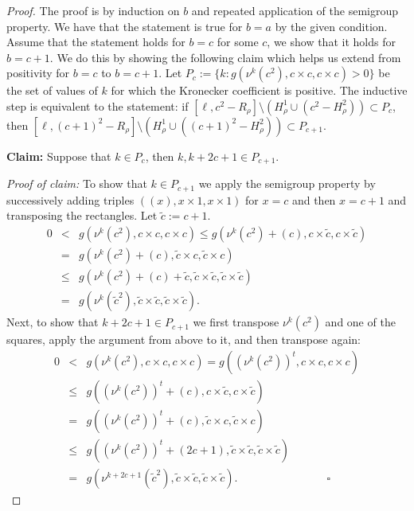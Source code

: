 \documentclass{article}
\numberwithin{equation}{section}
\theoremstyle{definition}
\begin{document}
\begin{proof}
The proof is by induction on $b$ and repeated application of the semigroup property.  We have that the statement is true for $b=a$ by the given condition. Assume that the statement holds for $b=c$ for some $c$, we show that it holds for $b=c+1$. We do this by showing the following claim which helps us extend from positivity for $b=c$ to $b=c+1$. Let $P_c := \{k: g( \nu^k(c^2), c \times c, c \times c) >0 \}$ be the set of values of $k$ for which the Kronecker coefficient is positive. The inductive step is equivalent to the statement: if $[ \ell , c^2 - R_\rho] \setminus \left( H^1_{\rho} \cup (c^2 - H^2_\rho) \right) \subset P_c$, then $[ \ell , (c+1)^2 - R_\rho] \setminus \left( H^1_{\rho} \cup ((c+1)^2 - H^2_\rho) \right) \subset P_{c+1}$.

\textbf{Claim:} Suppose that $k \in P_c$, then $k, k+2c+1 \in P_{c+1}$.

\textit{Proof of claim:} 
To show that $k \in P_{c+1}$
 we apply the semigroup property by successively adding triples $((x), x \times 1, x \times 1)$ for $x=c$ and then $x=c+1$ and transposing the rectangles.
 Let $\tilde c := c+1$.
\begin{eqnarray*}
0 &<&
g( \nu^k(c^2), c\times c, c\times c) \leq  g( \nu^k(c^2) + (c ), c\times \tilde c, c \times \tilde c) \\
&=& g( \nu^k(c^2) + (c) , \tilde c \times c, \tilde c \times c)\\
&\leq& g( \nu^k(c^2) + (c)+\tilde c , \tilde c \times {\tilde c}, {\tilde c} \times {\tilde c} ) \\
 &=& g(\nu^k( {\tilde c}^2), {\tilde c}\times {\tilde c}, {\tilde c}\times {\tilde c} ).
\end{eqnarray*}
Next, to show that $k +2c+1 \in P_{c+1}$ we first transpose $\nu^k(c^2)$ and one of the squares, apply the argument from above to it, and then transpose again:
\begin{eqnarray*} 
0 &<& g( \nu^{k} (c^2), c\times c, c\times c) = g( (\nu^{k} (c^2))^t  , c\times c, c\times c)\\
 &\leq& g( (\nu^k(c^2))^t + (c ), c\times {\tilde c}, c \times {\tilde c}) \\
 &=& g( (\nu^k(c^2))^t + (c) , {\tilde c} \times c, {\tilde c} \times c) \\
 &\leq& g( (\nu^k(c^2))^t + (2c+1)  , {\tilde c} \times {\tilde c}, {\tilde c} \times {\tilde c} ) \\
 &=& g(\nu^{k+2c+1}( {\tilde c}^2), {\tilde c}\times {\tilde c}, {\tilde c}\times {\tilde c} ).\quad\quad\quad\quad\quad\quad\quad\quad\square
\end{eqnarray*}


\end{proof}
\end{document}
